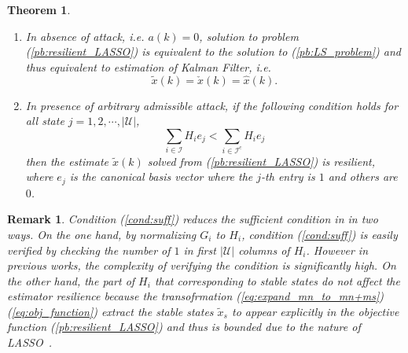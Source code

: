 \documentclass[journal]{IEEEtran}
\newcommand{\Cc}{{\mathcal{C}}}
\newcommand{\Ic}{{\mathcal{I}}}
\newcommand{\Uc}{{\mathcal{U}}}
\newcommand{\Hc}{{\mathcal{H}}}
\newtheorem{theorem}{\textbf{Theorem}}
\newtheorem{remark}{\textbf{Remark}}
\begin{document}
	\begin{theorem}
		\leavevmode
		\begin{enumerate}
			\item In absence of attack, i.e. $a(k)=0$, solution to problem (\ref{pb:resilient_LASSO}) is equivalent to the solution to (\ref{pb:LS_problem}) and thus equivalent to estimation of Kalman Filter, i.e.
			\begin{equation*}
				\tilde{x}(k)=\check{x}(k)=\hat{x}(k).
			\end{equation*}
			
			\item In presence of arbitrary admissible attack, if the following condition holds for all state $j=1,2,\cdots,|\Uc|$,
			\begin{equation}\label{cond:suff}
				\sum_{i\in\Ic} H_{i} e_j < \sum_{i\in\Ic^c} H_{i} e_j
			\end{equation}
			then the estimate $\tilde{x}(k)$ solved from (\ref{pb:resilient_LASSO}) is resilient,
			where $e_j$ is the canonical basis vector where the $j$-th entry is $1$ and others are $0$.
		\end{enumerate}
	\end{theorem}
	
	\begin{remark}
		Condition (\ref{cond:suff}) reduces the sufficient condition in \cite{liuxinghua-IFAC}\cite{handuo_tac} in two ways.
		On the one hand, by normalizing $G_i$ to $H_i$, condition (\ref{cond:suff}) is easily verified by checking the number of $1$ in first $|\Uc|$ columns of $H_i$. However in previous works, the complexity of verifying the condition is significantly high.
		On the other hand, the part of $H_i$ that corresponding to stable states do not affect the estimator resilience because the transofrmation (\ref{eq:expand_mn_to_mn+ms})(\ref{eq:obj_function}) extract the stable states $\tilde{x}_s$ to appear explicitly in the objective function (\ref{pb:resilient_LASSO}) and thus is bounded due to the nature of LASSO~\cite{LASSOTibshirani}.
		
	\end{remark}
	
\end{document}
